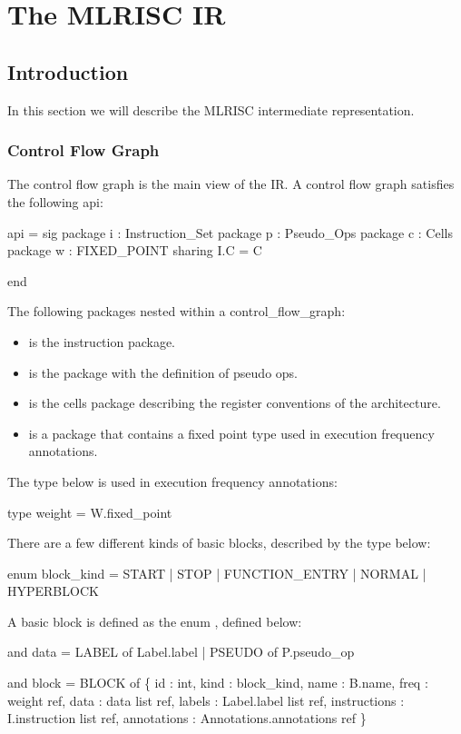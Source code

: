 \section{The MLRISC IR}
\subsection{Introduction}

In this section we will describe the MLRISC intermediate representation.

\subsubsection{Control Flow Graph}
The control flow graph is the main view of the IR.  
A control flow graph satisfies the following api:
\begin{SML}
 api  = sig
   package i : Instruction_Set
   package p : Pseudo_Ops
   package c : Cells
   package w : FIXED_POINT 
      sharing I.C = C
   
 end
\end{SML}

The following packages nested within a control_flow_graph:
\begin{itemize}
   \item {} is the instruction package.
   \item {} is the package with the definition
of pseudo ops.
   \item {} is the cells package describing the
register conventions of the architecture.
   \item {} is a package that contains
a fixed point type used in execution frequency annotations.
\end{itemize}

The type  below is used in execution frequency annotations:
\begin{SML}
   type weight = W.fixed_point
\end{SML}

There are a few different kinds of basic blocks, described
by the type  below:
\begin{SML}
   enum block_kind = 
       START          
     | STOP          
     | FUNCTION_ENTRY
     | NORMAL        
     | HYPERBLOCK   
\end{SML}

A basic block is defined as the enum , defined below:
\begin{SML}
   and data = LABEL  of Label.label
            | PSEUDO of P.pseudo_op

   and block = 
      BLOCK of
      \{  id          : int,                      
         kind        : block_kind,                 
         name        : B.name,                    
         freq        : weight ref,                
         data        : data list ref,             
         labels      : Label.label list ref,     
         instructions       : I.instruction list ref,     
         annotations : Annotations.annotations ref 
      \}
\end{SML}

